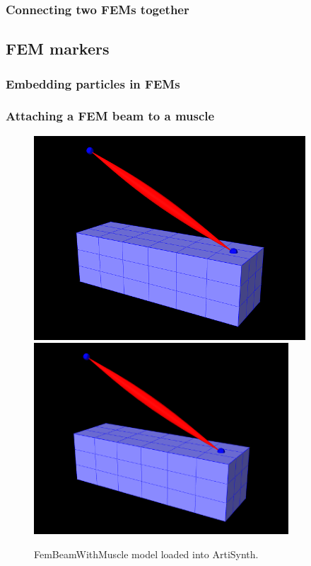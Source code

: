 
\subsubsection{Connecting two FEMs together}


\subsection{FEM markers}

\subsubsection{Embedding particles in FEMs}

\subsubsection{Attaching a FEM beam to a muscle}

\begin{figure}[ht]
\begin{center}
\iflatexml
 \includegraphics[]{images/FemBeamWithMuscle}
\else
 \includegraphics[width=3.75in]{images/FemBeamWithMuscle}
\fi
\end{center}
\caption{FemBeamWithMuscle model loaded into ArtiSynth.}
\label{FemBeamWithMuscle:fig}
\end{figure}

